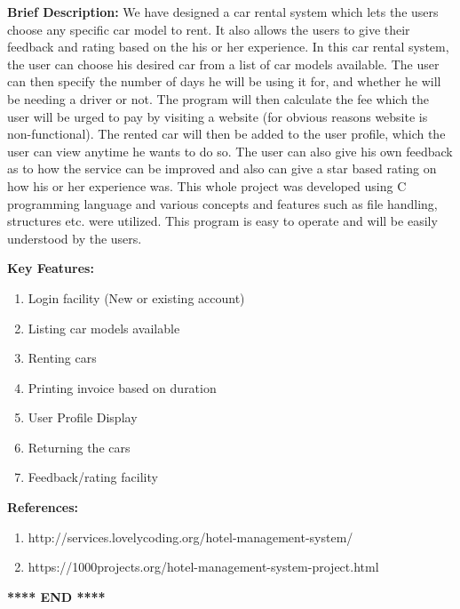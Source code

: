 \documentclass[12pt]{article}
\begin{document}
\noindent
\textbf{Brief Description:}
\newline
We have designed a car rental system which lets the users choose any specific car model to rent. It also allows the users to give their feedback and rating based on the his or her experience. 
\newline
\newline
In this car rental system, the user can choose his desired car from a list of car models available. The user can then specify the number of days he will be using it for, and whether he will be needing a driver or not. The program will then calculate the fee which the user will be urged to pay by visiting a website (for obvious reasons website is non-functional). The rented car will then be added to the user profile, which the user can view anytime he wants to do so. The user can also give his own feedback as to how the service can be improved and also can give a star based rating on how his or her experience was. This whole project was developed using C programming language and various concepts and features such as file handling, structures etc. were utilized. This program is easy to operate and will be easily understood by the users.

\noindent
\textbf{Key Features:}
\begin{enumerate}
    \item Login facility (New or existing account)
    \item Listing car models available
    \item Renting cars
    \item Printing invoice based on duration
    \item User Profile Display
    \item Returning the cars
    \item Feedback/rating facility
\end{enumerate}

\noindent
\textbf{References:}
\begin{enumerate}
    \item http://services.lovelycoding.org/hotel-management-system/
    \item https://1000projects.org/hotel-management-system-project.html
\end{enumerate}


\begin{center}
    \textbf{**** END ****}
\end{center}
\end{document}
